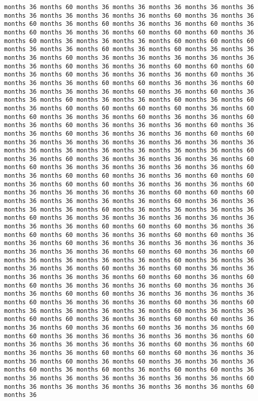 \documentclass[11pt]{article}
\begin{document}
\begin{Verbatim}[commandchars=\\\{\}, frame=single, framerule=2mm, rulecolor=\color{outerrorbackground}]
months 36 months 60 months 36 months 36 months 36 months 36 months 36 months 36 months 36 months 36 months 36 months 60 months 36 months 36 months 60 months 36 months 60 months 36 months 36 months 60 months 36 months 60 months 36 months 36 months 60 months 60 months 60 months 36 months 60 months 36 months 36 months 36 months 60 months 60 months 60 months 36 months 36 months 60 months 36 months 60 months 36 months 36 months 36 months 60 months 36 months 36 months 36 months 36 months 36 months 36 months 60 months 36 months 36 months 60 months 60 months 60 months 36 months 60 months 36 months 36 months 36 months 60 months 36 months 36 months 36 months 60 months 60 months 36 months 36 months 60 months 36 months 36 months 36 months 60 months 36 months 60 months 36 months 36 months 60 months 36 months 36 months 60 months 36 months 60 months 36 months 60 months 60 months 60 months 60 months 36 months 60 months 60 months 36 months 36 months 60 months 36 months 36 months 60 months 36 months 60 months 36 months 36 months 36 months 60 months 36 months 36 months 60 months 36 months 36 months 36 months 60 months 60 months 36 months 36 months 36 months 36 months 36 months 36 months 36 months 36 months 36 months 36 months 36 months 36 months 36 months 60 months 36 months 60 months 36 months 36 months 36 months 36 months 60 months 60 months 36 months 36 months 36 months 36 months 36 months 60 months 36 months 60 months 60 months 36 months 36 months 60 months 60 months 36 months 60 months 60 months 36 months 36 months 36 months 60 months 36 months 36 months 36 months 36 months 60 months 60 months 60 months 36 months 36 months 36 months 36 months 60 months 36 months 36 months 36 months 36 months 60 months 36 months 36 months 36 months 36 months 60 months 36 months 36 months 36 months 36 months 36 months 36 months 36 months 36 months 60 months 60 months 60 months 36 months 36 months 60 months 60 months 36 months 36 months 60 months 60 months 36 months 36 months 60 months 36 months 36 months 36 months 36 months 36 months 36 months 36 months 36 months 60 months 60 months 36 months 60 months 36 months 36 months 36 months 36 months 60 months 36 months 36 months 36 months 36 months 60 months 36 months 60 months 36 months 36 months 36 months 36 months 36 months 60 months 60 months 36 months 60 months 60 months 36 months 36 months 36 months 60 months 36 months 36 months 36 months 60 months 60 months 36 months 36 months 36 months 36 months 60 months 36 months 36 months 36 months 60 months 36 months 60 months 36 months 36 months 36 months 36 months 60 months 36 months 36 months 60 months 60 months 36 months 36 months 60 months 60 months 36 months 36 months 60 months 36 months 60 months 36 months 36 months 60 months 60 months 36 months 36 months 36 months 36 months 36 months 60 months 36 months 36 months 36 months 36 months 60 months 36 months 60 months 36 months 36 months 60 months 60 months 60 months 36 months 36 months 36 months 60 months 36 months 60 months 36 months 36 months 36 months 60 months 36 months 60 months 36 months 60 months 60 months 36 months 36 months 36 months 36 months 36 months 36 months 36 months 60 months 36 months 36 months 36 months 36 months 36 months 36 months 60 months 36 
\end{Verbatim}
\end{document}
